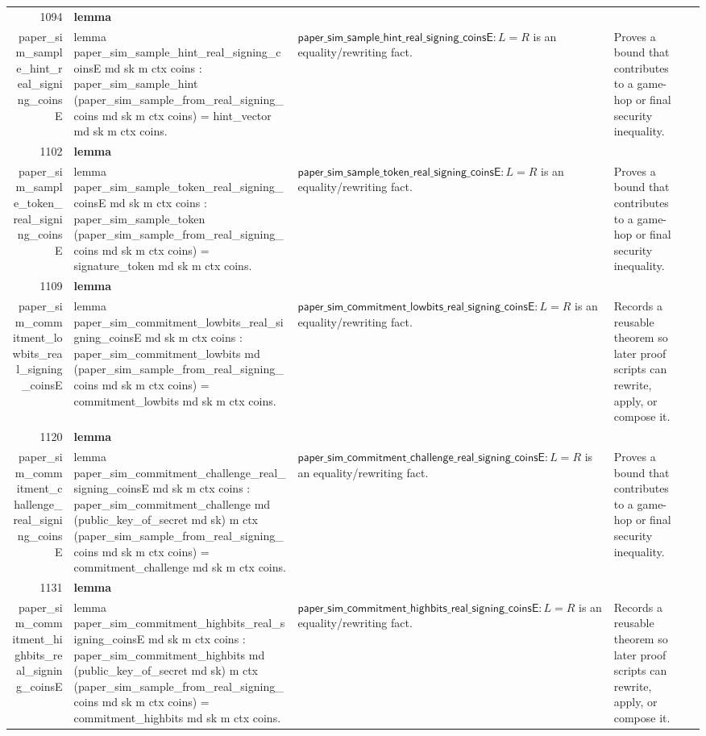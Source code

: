 \documentclass[10pt]{article}
\newcommand{\ec}[1]{\begingroup\ttfamily\scriptsize #1\endgroup}
\begin{document}
\begin{longtable}{r L{0.17\textwidth} L{0.26\textwidth} L{0.27\textwidth} L{0.20\textwidth}}
1094 & \textbf{lemma}\\\ec{paper\_sim\_sample\_hint\_real\_signing\_coinsE} & \ec{lemma paper\_sim\_sample\_hint\_real\_signing\_coinsE md sk m ctx coins : paper\_sim\_sample\_hint (paper\_sim\_sample\_from\_real\_signing\_coins md sk m ctx coins) = hint\_vector md sk m ctx coins.} & \(\mathsf{paper\_sim\_sample\_hint\_real\_signing\_coinsE} : L = R\) is an equality/rewriting fact. & Proves a bound that contributes to a game-hop or final security inequality. \\
1102 & \textbf{lemma}\\\ec{paper\_sim\_sample\_token\_real\_signing\_coinsE} & \ec{lemma paper\_sim\_sample\_token\_real\_signing\_coinsE md sk m ctx coins : paper\_sim\_sample\_token (paper\_sim\_sample\_from\_real\_signing\_coins md sk m ctx coins) = signature\_token md sk m ctx coins.} & \(\mathsf{paper\_sim\_sample\_token\_real\_signing\_coinsE} : L = R\) is an equality/rewriting fact. & Proves a bound that contributes to a game-hop or final security inequality. \\
1109 & \textbf{lemma}\\\ec{paper\_sim\_commitment\_lowbits\_real\_signing\_coinsE} & \ec{lemma paper\_sim\_commitment\_lowbits\_real\_signing\_coinsE md sk m ctx coins : paper\_sim\_commitment\_lowbits md (paper\_sim\_sample\_from\_real\_signing\_coins md sk m ctx coins) = commitment\_lowbits md sk m ctx coins.} & \(\mathsf{paper\_sim\_commitment\_lowbits\_real\_signing\_coinsE} : L = R\) is an equality/rewriting fact. & Records a reusable theorem so later proof scripts can rewrite, apply, or compose it. \\
1120 & \textbf{lemma}\\\ec{paper\_sim\_commitment\_challenge\_real\_signing\_coinsE} & \ec{lemma paper\_sim\_commitment\_challenge\_real\_signing\_coinsE md sk m ctx coins : paper\_sim\_commitment\_challenge md (public\_key\_of\_secret md sk) m ctx (paper\_sim\_sample\_from\_real\_signing\_coins md sk m ctx coins) = commitment\_challenge md sk m ctx coins.} & \(\mathsf{paper\_sim\_commitment\_challenge\_real\_signing\_coinsE} : L = R\) is an equality/rewriting fact. & Proves a bound that contributes to a game-hop or final security inequality. \\
1131 & \textbf{lemma}\\\ec{paper\_sim\_commitment\_highbits\_real\_signing\_coinsE} & \ec{lemma paper\_sim\_commitment\_highbits\_real\_signing\_coinsE md sk m ctx coins : paper\_sim\_commitment\_highbits md (public\_key\_of\_secret md sk) m ctx (paper\_sim\_sample\_from\_real\_signing\_coins md sk m ctx coins) = commitment\_highbits md sk m ctx coins.} & \(\mathsf{paper\_sim\_commitment\_highbits\_real\_signing\_coinsE} : L = R\) is an equality/rewriting fact. & Records a reusable theorem so later proof scripts can rewrite, apply, or compose it. \\

\end{longtable}
\end{document}

